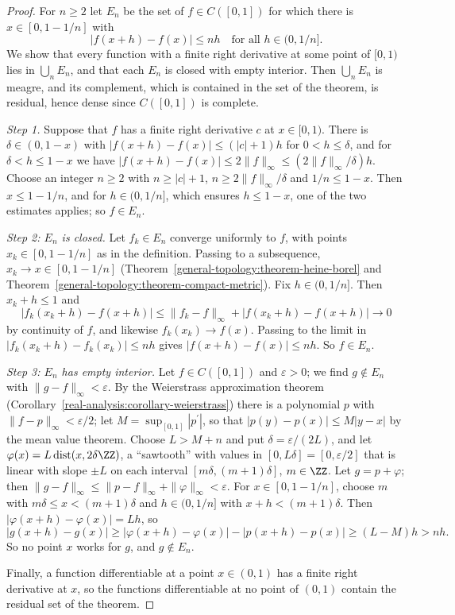 \begin{proof}
For $n \geq 2$ let $E_n$ be the set of $f \in C([0, 1])$ for which there is $x \in [0, 1 - 1/n]$ with
\[
|f(x + h) - f(x)| \leq nh \quad\text{for all } h \in (0, 1/n].
\]
We show that every function with a finite right derivative at some point of $[0, 1)$ lies in $\bigcup_nE_n$, and that each $E_n$ is closed with empty interior. Then $\bigcup_nE_n$ is meagre, and
its complement, which is contained in the set of the theorem, is residual, hence dense since $C([0, 1])$ is complete.

\emph{Step 1.} Suppose that $f$ has a finite right derivative $c$ at $x \in [0, 1)$. There is $\delta \in (0, 1 - x)$ with $|f(x + h) - f(x)| \leq (|c| + 1)h$ for $0 < h \leq \delta$, and for
$\delta < h \leq 1 - x$ we have $|f(x + h) - f(x)| \leq 2\|f\|_\infty \leq (2\|f\|_\infty/\delta)h$. Choose an integer $n \geq 2$ with $n \geq |c| + 1$, $n \geq 2\|f\|_\infty/\delta$ and
$1/n \leq 1 - x$. Then $x \leq 1 - 1/n$, and for $h \in (0, 1/n]$, which ensures $h \leq 1 - x$, one of the two estimates applies; so $f \in E_n$.

\emph{Step 2: $E_n$ is closed.} Let $f_k \in E_n$ converge uniformly to $f$, with points $x_k \in [0, 1 - 1/n]$ as in the definition. Passing to a subsequence, $x_k \to x \in [0, 1 - 1/n]$
(Theorem~\ref{general-topology:theorem-heine-borel} and Theorem~\ref{general-topology:theorem-compact-metric}). Fix $h \in (0, 1/n]$. Then $x_k + h \leq 1$ and
\[
|f_k(x_k + h) - f(x + h)| \leq \|f_k - f\|_\infty + |f(x_k + h) - f(x + h)| \to 0
\]
by continuity of $f$, and likewise $f_k(x_k) \to f(x)$. Passing to the limit in $|f_k(x_k + h) - f_k(x_k)| \leq nh$ gives $|f(x + h) - f(x)| \leq nh$. So $f \in E_n$.

\emph{Step 3: $E_n$ has empty interior.} Let $f \in C([0, 1])$ and $\varepsilon > 0$; we find $g \notin E_n$ with $\|g - f\|_\infty < \varepsilon$. By the Weierstrass approximation theorem
(Corollary~\ref{real-analysis:corollary-weierstrass}) there is a polynomial $p$ with $\|f - p\|_\infty < \varepsilon/2$; let $M = \sup_{[0, 1]}|p^{\prime}|$, so that $|p(y) - p(x)| \leq M|y - x|$ by the
mean value theorem. Choose $L > M + n$ and put $\delta = \varepsilon/(2L)$, and let $\varphi(x) = L\operatorname{dist}(x, 2\delta\ZZ)$, a ``sawtooth'' with values in $[0, L\delta] = [0, \varepsilon/2]$
that is linear with slope $\pm L$ on each interval $[m\delta, (m + 1)\delta]$, $m \in \ZZ$. Let $g = p + \varphi$; then $\|g - f\|_\infty \leq \|p - f\|_\infty + \|\varphi\|_\infty < \varepsilon$. For
$x \in [0, 1 - 1/n]$, choose $m$ with $m\delta \leq x < (m + 1)\delta$ and $h \in (0, 1/n]$ with $x + h < (m + 1)\delta$. Then $|\varphi(x + h) - \varphi(x)| = Lh$, so
\[
|g(x + h) - g(x)| \geq |\varphi(x + h) - \varphi(x)| - |p(x + h) - p(x)| \geq (L - M)h > nh .
\]
So no point $x$ works for $g$, and $g \notin E_n$.

Finally, a function differentiable at a point $x \in (0, 1)$ has a finite right derivative at $x$, so the functions differentiable at no point of $(0, 1)$ contain the residual set of the theorem.
\end{proof}

